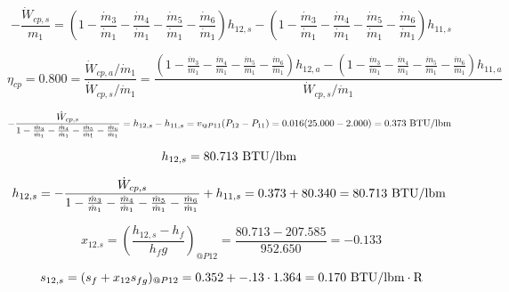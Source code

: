 \documentclass{article}
\begin{document}
\begin{equation}
-\frac{\dot{W}_{cp ,s}}{m_1} = (1 - \frac{\dot{m}_{ 3}}{\dot{m}_{ 1}} - \frac{\dot{m}_{ 4}}{\dot{m}_{ 1}} - \frac{\dot{m}_{ 5}}{\dot{m}_{ 1}} - \frac{\dot{m}_{ 6}}{\dot{m}_{ 1}})h_{12,s} - (1 - \frac{\dot{m}_{ 3}}{\dot{m}_{ 1}} - \frac{\dot{m}_{ 4}}{\dot{m}_{ 1}} - \frac{\dot{m}_{ 5}}{\dot{m}_{ 1}} - \frac{\dot{m}_{ 6}}{\dot{m}_{ 1}})h_{11,s}\end{equation}

\begin{equation}
\eta_{cp } =    0.800 = \frac{\dot{W}_{cp ,a} / \dot{m}_{1}}{\dot{W}_{cp ,s} / \dot{m}_{1}} = \frac{
(1 - \frac{\dot{m}_{ 3}}{\dot{m}_{ 1}} - \frac{\dot{m}_{ 4}}{\dot{m}_{ 1}} - \frac{\dot{m}_{ 5}}{\dot{m}_{ 1}} - \frac{\dot{m}_{ 6}}{\dot{m}_{ 1}})h_{12,a} - (1 - \frac{\dot{m}_{ 3}}{\dot{m}_{ 1}} - \frac{\dot{m}_{ 4}}{\dot{m}_{ 1}} - \frac{\dot{m}_{ 5}}{\dot{m}_{ 1}} - \frac{\dot{m}_{ 6}}{\dot{m}_{ 1}})h_{11,a}}{\dot{W}_{cp ,s} / \dot{m}_{1}}
\end{equation}

\begin{equation}
-\frac{\dot{W}_{cp,s}}{1 - \frac{\dot{m}_{ 3}}{\dot{m}_{ 1}} - \frac{\dot{m}_{ 4}}{\dot{m}_{ 1}} - \frac{\dot{m}_{ 5}}{\dot{m}_{ 1}} - \frac{\dot{m}_{ 6}}{\dot{m}_{ 1}}} = h_{12,s} - h_{11,s} = v_{@P11}(P_{12} - P_{11}) =    0.016(  25.000 -    2.000) =    0.373\textnormal{ BTU/lbm                   }
\end{equation}

\begin{equation}
  h_{12,s} =   80.713\textnormal{ BTU/lbm                   }
\end{equation}

\begin{equation}
h_{12,s} = -\frac{\dot{W}_{cp,s}}{1 - \frac{\dot{m}_{ 3}}{\dot{m}_{ 1}} - \frac{\dot{m}_{ 4}}{\dot{m}_{ 1}} - \frac{\dot{m}_{ 5}}{\dot{m}_{ 1}} - \frac{\dot{m}_{ 6}}{\dot{m}_{ 1}}} + h_{11,s} =    0.373 +   80.340 =   80.713\textnormal{ BTU/lbm                   }
\end{equation}

\begin{equation}
x_{12.s} = (\frac{h_{12,s} - h_{f}}{h_fg})_{@P12} = \frac{  80.713 -  207.585}{ 952.650} =   -0.133
\end{equation}

\begin{equation}
  s_{12,s} = (s_{f} + x_{12}s_{fg})_{@P12} =    0.352 + -.13\cdot   1.364 =    0.170
\textnormal{ BTU/lbm}\cdot\textnormal{R}
\end{equation}
\end{document}
